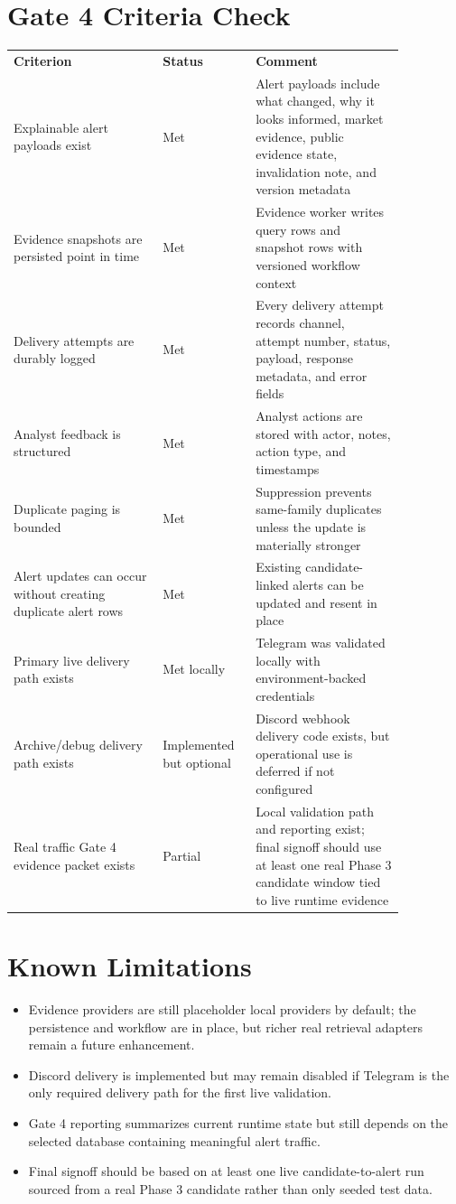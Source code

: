 \documentclass{article}
\begin{document}
\section*{Gate 4 Criteria Check}
\begin{longtable}{p{0.34\linewidth}p{0.18\linewidth}p{0.34\linewidth}}
\textbf{Criterion} & \textbf{Status} & \textbf{Comment} \\
Explainable alert payloads exist & Met & Alert payloads include what changed, why it looks informed, market evidence, public evidence state, invalidation note, and version metadata \\
Evidence snapshots are persisted point in time & Met & Evidence worker writes query rows and snapshot rows with versioned workflow context \\
Delivery attempts are durably logged & Met & Every delivery attempt records channel, attempt number, status, payload, response metadata, and error fields \\
Analyst feedback is structured & Met & Analyst actions are stored with actor, notes, action type, and timestamps \\
Duplicate paging is bounded & Met & Suppression prevents same-family duplicates unless the update is materially stronger \\
Alert updates can occur without creating duplicate alert rows & Met & Existing candidate-linked alerts can be updated and resent in place \\
Primary live delivery path exists & Met locally & Telegram was validated locally with environment-backed credentials \\
Archive/debug delivery path exists & Implemented but optional & Discord webhook delivery code exists, but operational use is deferred if not configured \\
Real traffic Gate 4 evidence packet exists & Partial & Local validation path and reporting exist; final signoff should use at least one real Phase 3 candidate window tied to live runtime evidence \\
\end{longtable}

\section*{Known Limitations}
\begin{itemize}
\item Evidence providers are still placeholder local providers by default; the persistence and workflow are in place, but richer real retrieval adapters remain a future enhancement.
\item Discord delivery is implemented but may remain disabled if Telegram is the only required delivery path for the first live validation.
\item Gate 4 reporting summarizes current runtime state but still depends on the selected database containing meaningful alert traffic.
\item Final signoff should be based on at least one live candidate-to-alert run sourced from a real Phase 3 candidate rather than only seeded test data.
\end{itemize}
\end{document}
